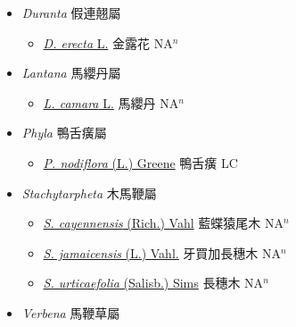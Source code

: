 
  \begin{itemize}
 \item[] \textit{Duranta} 假連翹屬
                    
  \begin{itemize}
        \item[] \href{http://www.theplantlist.org/tpl1.1/search?q=Duranta+erecta}{\textit{D. erecta} L.}   金露花 NA$^n$
  \end{itemize}
 \item[] \textit{Lantana} 馬纓丹屬
                    
  \begin{itemize}
        \item[] \href{http://www.theplantlist.org/tpl1.1/search?q=Lantana+camara}{\textit{L. camara} L.}   馬纓丹 NA$^n$
  \end{itemize}
 \item[] \textit{Phyla} 鴨舌癀屬
                    
  \begin{itemize}
        \item[] \href{http://www.theplantlist.org/tpl1.1/search?q=Phyla+nodiflora}{\textit{P. nodiflora} (L.) Greene}   鴨舌癀 LC
  \end{itemize}
 \item[] \textit{Stachytarpheta} 木馬鞭屬
                    
  \begin{itemize}
        \item[] \href{http://www.theplantlist.org/tpl1.1/search?q=Stachytarpheta+cayennensis}{\textit{S. cayennensis} (Rich.) Vahl}   藍蝶猿尾木 NA$^n$
        \item[] \href{http://www.theplantlist.org/tpl1.1/search?q=Stachytarpheta+jamaicensis}{\textit{S. jamaicensis} (L.) Vahl.}   牙買加長穗木 NA$^n$
        \item[] \href{http://www.theplantlist.org/tpl1.1/search?q=Stachytarpheta+urticaefolia}{\textit{S. urticaefolia} (Salisb.) Sims}   長穗木 NA$^n$
  \end{itemize}
 \item[] \textit{Verbena} 馬鞭草屬
                    

\end{itemize}
